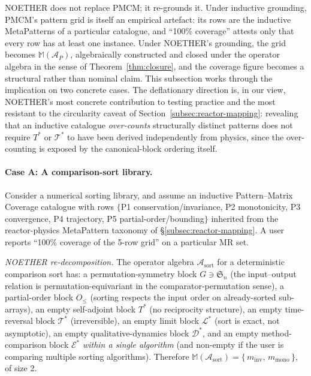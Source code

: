 \documentclass[acmsmall, screen]{acmart}
\begin{document}
NOETHER does not replace PMCM; it re-grounds it. Under inductive grounding, PMCM's pattern grid is itself an empirical artefact: its rows are the inductive MetaPatterns of a particular catalogue, and ``100\% coverage'' attests only that every row has at least one instance. Under NOETHER's grounding, the grid becomes $\mathbb{M}(\mathcal{A}_P)$, algebraically constructed and closed under the operator algebra in the sense of Theorem~\ref{thm:closure}, and the coverage figure becomes a structural rather than nominal claim. This subsection works through the implication on two concrete cases. The deflationary direction is, in our view, NOETHER's most concrete contribution to testing practice and the most resistant to the circularity caveat of Section~\ref{subsec:reactor-mapping}: revealing that an inductive catalogue \emph{over-counts} structurally distinct patterns does not require $T^{*}$ or $\mathcal{T}^{*}$ to have been derived independently from physics, since the over-counting is exposed by the canonical-block ordering itself.

\paragraph{Case A: A comparison-sort library.}
Consider a numerical sorting library, and assume an inductive Pattern--Matrix Coverage catalogue with rows $\{$P1 conservation/invariance, P2 monotonicity, P3 convergence, P4 trajectory, P5 partial-order/bounding$\}$ inherited from the reactor-physics MetaPattern taxonomy of \S\ref{subsec:reactor-mapping}. A user reports ``100\% coverage of the 5-row grid'' on a particular MR set.

\noindent \emph{NOETHER re-decomposition.} The operator algebra $\mathcal{A}_{\mathrm{sort}}$ for a deterministic comparison sort has: a permutation-symmetry block $G \ni \mathfrak{S}_n$ (the input--output relation is permutation-equivariant in the comparator-permutation sense), a partial-order block $O_{\le}$ (sorting respects the input order on already-sorted sub-arrays), an empty self-adjoint block $T^{*}$ (no reciprocity structure), an empty time-reversal block $\mathcal{T}^{*}$ (irreversible), an empty limit block $\mathcal{L}^{*}$ (sort is exact, not asymptotic), an empty qualitative-dynamics block $\mathcal{D}^{*}$, and an empty method-comparison block $\mathcal{E}^{*}$ \emph{within a single algorithm} (and non-empty if the user is comparing multiple sorting algorithms). Therefore $\mathbb{M}(\mathcal{A}_{\mathrm{sort}}) = \{\,m_{\mathrm{inv}},\, m_{\mathrm{mono}}\,\}$, of size 2.
\end{document}
